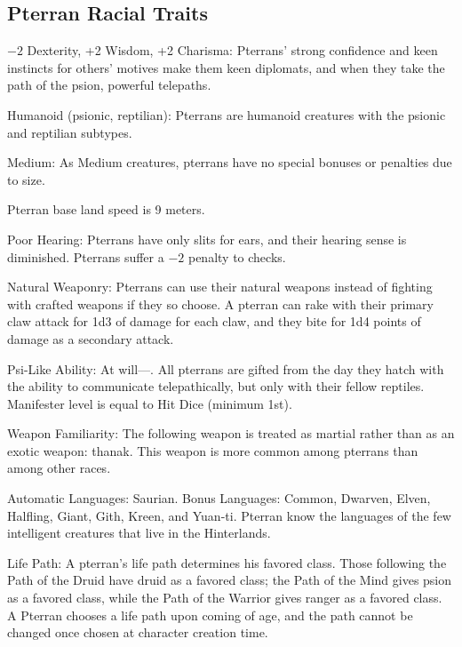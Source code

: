 \subsection{Pterran Racial Traits}
\begin{itemize*}
    \item $-2$ Dexterity, +2 Wisdom, +2 Charisma: Pterrans' strong confidence and keen instincts for others' motives make them keen diplomats, and when they take the path of the psion, powerful telepaths.
    \item Humanoid (psionic, reptilian): Pterrans are humanoid creatures with the psionic and reptilian subtypes.
    \item Medium: As Medium creatures, pterrans have no special bonuses or penalties due to size.
    \item Pterran base land speed is 9 meters.
    \item Poor Hearing: Pterrans have only slits for ears, and their hearing sense is diminished. Pterrans suffer a $-2$ penalty to  checks.
    \item Natural Weaponry: Pterrans can use their natural weapons instead of fighting with crafted weapons if they so choose. A pterran can rake with their primary claw attack for 1d3 of damage for each claw, and they bite for 1d4 points of damage as a secondary attack.
    \item Psi-Like Ability: At will---. All pterrans are gifted from the day they hatch with the ability to communicate telepathically, but only with their fellow reptiles. Manifester level is equal to \onehalf Hit Dice (minimum 1st).
    \item Weapon Familiarity: The following weapon is treated as martial rather than as an exotic weapon: thanak. This weapon is more common among pterrans than among other races.
    \item Automatic Languages: Saurian. Bonus Languages: Common, Dwarven, Elven, Halfling, Giant, Gith, Kreen, and Yuan-ti. Pterran know the languages of the few intelligent creatures that live in the Hinterlands.
    \item Life Path: A pterran's life path determines his favored class. Those following the Path of the Druid have druid as a favored class; the Path of the Mind gives psion as a favored class, while the Path of the Warrior gives ranger as a favored class. A Pterran chooses a life path upon coming of age, and the path cannot be changed once chosen at character creation time.
\end{itemize*}